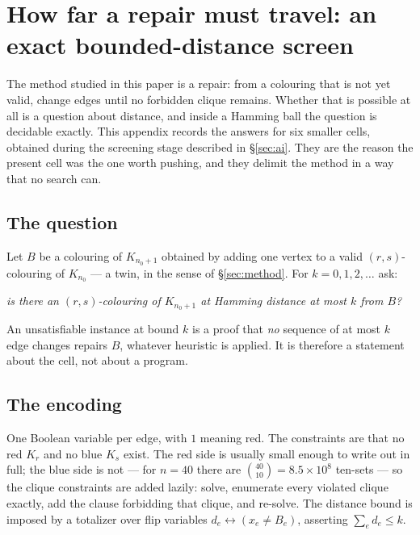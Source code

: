 \appendix

\section{How far a repair must travel: an exact bounded-distance screen}\label{app:distance}

The method studied in this paper is a repair: from a colouring that is not yet valid, change edges
until no forbidden clique remains. Whether that is possible at all is a question about distance, and
inside a Hamming ball the question is decidable exactly. This appendix records the answers for six
smaller cells, obtained during the screening stage described in \S\ref{sec:ai}. They are the reason
the present cell was the one worth pushing, and they delimit the method in a way that no search can.

\subsection*{The question}

Let $B$ be a colouring of $K_{n_0+1}$ obtained by adding one vertex to a valid $(r,s)$-colouring of
$K_{n_0}$ --- a twin, in the sense of \S\ref{sec:method}. For $k=0,1,2,\dots$ ask:

\begin{center}
\emph{is there an $(r,s)$-colouring of $K_{n_0+1}$ at Hamming distance at most $k$ from $B$?}
\end{center}

An unsatisfiable instance at bound $k$ is a proof that \emph{no} sequence of at most $k$ edge changes
repairs $B$, whatever heuristic is applied. It is therefore a statement about the cell, not about a
program.

\subsection*{The encoding}

One Boolean variable per edge, with $1$ meaning red. The constraints are that no red $K_r$ and no blue
$K_s$ exist. The red side is usually small enough to write out in full; the blue side is not --- for
$n=40$ there are $\binom{40}{10}=8.5\times10^{8}$ ten-sets --- so the clique constraints are added
lazily: solve, enumerate every violated clique exactly, add the clause forbidding that clique, and
re-solve. The distance bound is imposed by a totalizer over flip variables
$d_e \leftrightarrow (x_e \neq B_e)$, asserting $\sum_e d_e \le k$.

